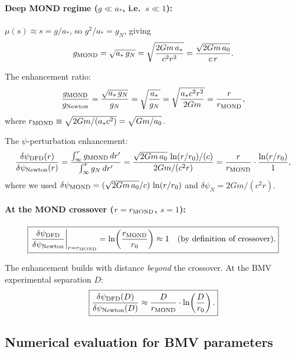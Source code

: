 \documentclass[11pt,a4paper]{article}
\begin{document}
\paragraph{Deep MOND regime ($g \ll a_*$, i.e.\ $s \ll 1$):}
$\mu(s) \approx s = g/a_*$, so $g^2/a_* = g_N$, giving
\begin{equation}
g_{\rm MOND} = \sqrt{a_*\,g_N} = \sqrt{\frac{2Gm\,a_*}{c^2 r^2}}
= \frac{\sqrt{2Gm\,a_0}}{c\,r}.
\end{equation}

The enhancement ratio:
\begin{equation}
\frac{g_{\rm MOND}}{g_{\rm Newton}}
= \frac{\sqrt{a_*\,g_N}}{g_N}
= \sqrt{\frac{a_*}{g_N}}
= \sqrt{\frac{a_* c^2 r^2}{2Gm}}
= \frac{r}{r_{\rm MOND}},
\end{equation}
where $r_{\rm MOND} \equiv \sqrt{2Gm/(a_* c^2)} = \sqrt{Gm/a_0}$.

The $\psi$-perturbation enhancement:
\begin{equation}
\frac{\delta\psi_{\rm DFD}(r)}{\delta\psi_{\rm Newton}(r)}
= \frac{\int_\infty^r g_{\rm MOND}\,dr'}{\int_\infty^r g_N\,dr'}
= \frac{\sqrt{2Gm\,a_0}\,\ln(r/r_0)/(c)}
{2Gm/(c^2 r)}
= \frac{r}{r_{\rm MOND}}\cdot\frac{\ln(r/r_0)}{1},
\end{equation}
where we used $\delta\psi_{\rm MOND} = (\sqrt{2Gm\,a_0}/c)\,\ln(r/r_0)$ and
$\delta\psi_N = 2Gm/(c^2 r)$.

\paragraph{At the MOND crossover ($r = r_{\rm MOND}$, $s = 1$):}
\begin{equation}
\boxed{
\left.\frac{\delta\psi_{\rm DFD}}{\delta\psi_{\rm Newton}}\right|_{r=r_{\rm MOND}}
= \ln\!\left(\frac{r_{\rm MOND}}{r_0}\right) \approx 1
\quad\text{(by definition of crossover)}.
}
\end{equation}

The enhancement builds with distance \emph{beyond} the crossover.  At
the BMV experimental separation $D$:
\begin{equation}
\boxed{
\frac{\delta\psi_{\rm DFD}(D)}{\delta\psi_{\rm Newton}(D)}
\approx \frac{D}{r_{\rm MOND}}\cdot\ln\!\left(\frac{D}{r_0}\right).
}
\end{equation}

\subsection{Numerical evaluation for BMV parameters}
\end{document}
